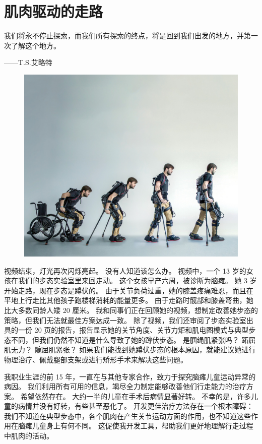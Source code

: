\chapter{肌肉驱动的走路} \label{chap:chap11}

我们将永不停止探索，而我们所有探索的终点，将是回到我们出发的地方，并第一次了解这个地方。
\begin{flushright}
	——T.S.艾略特
\end{flushright}


\begin{figure}[!htb]
	\centering
	\includegraphics[width=1.0\linewidth]{chap11/11_0}
	\caption*{ \label{fig:11_0}}
\end{figure}


视频结束，灯光再次闪烁亮起。
没有人知道该怎么办。
视频中，一个 13 岁的女孩在我们的步态实验室里来回走动。
这个女孩早产六周，被诊断为脑瘫。
她 3 岁开始走路，现在步态是蹲伏的。
由于关节负荷过重，她的膝盖疼痛难忍，而且在平地上行走比其他孩子跑楼梯消耗的能量更多。
由于走路时髋部和膝盖弯曲，她比大多数同龄人矮 20 厘米。
我和同事们正在回顾她的视频，想制定改善她步态的策略，但我们无法就最佳方案达成一致。
除了视频，我们还审阅了步态实验室出具的一份 20 页的报告，报告显示她的关节角度、关节力矩​​和肌电图模式与典型步态不同，但我们仍然不知道是什么导致了她的蹲伏步态。
是腘绳肌紧张吗？
跖屈肌无力？
髋屈肌紧张？
如果我们能找到她蹲伏步态的根本原因，就能建议她进行物理治疗、佩戴腿部支架或进行矫形手术来解决这些问题。


我职业生涯的前 15 年，一直在与其他专家合作，致力于探究脑瘫儿童运动异常的病因。
我们利用所有可用的信息，竭尽全力制定能够改善他们行走能力的治疗方案。
希望依然存在。
大约一半的儿童在手术后病情显著好转。
不幸的是，许多儿童的病情并没有好转，有些甚至恶化了。
开发更佳治疗方法存在一个根本障碍：我们不知道在典型步态中，各个肌肉在产生关节运动方面的作用，也不知道这些作用在脑瘫儿童身上有何不同。
这促使我开发工具，帮助我们更好地理解行走过程中肌肉的活动。


